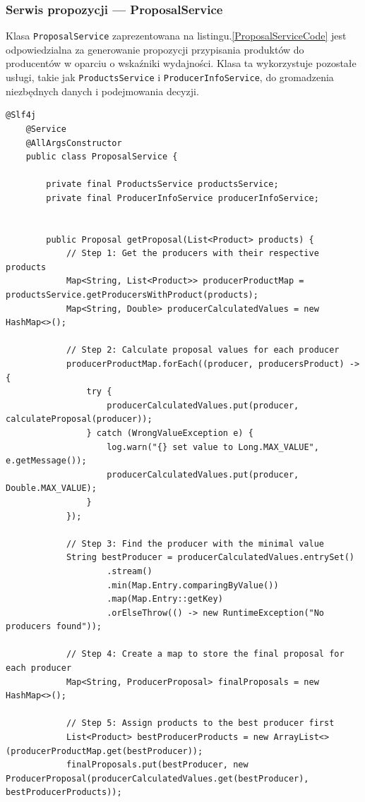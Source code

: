 \subsubsection{Serwis propozycji --- ProposalService}

Klasa \verb|ProposalService| zaprezentowana na listingu.\ref{ProposalServiceCode} jest odpowiedzialna za generowanie propozycji przypisania produktów do producentów w oparciu o wskaźniki wydajności. Klasa ta wykorzystuje pozostałe usługi, takie jak \verb|ProductsService| i \verb|ProducerInfoService|, do gromadzenia niezbędnych danych i podejmowania decyzji.

\begin{lstlisting}[caption=Kod klasy ProposalService, label=ProposalServiceCode] 
    @Slf4j
    @Service
    @AllArgsConstructor
    public class ProposalService {
    
        private final ProductsService productsService;
        private final ProducerInfoService producerInfoService;
    
    
        public Proposal getProposal(List<Product> products) {
            // Step 1: Get the producers with their respective products
            Map<String, List<Product>> producerProductMap = productsService.getProducersWithProduct(products);
            Map<String, Double> producerCalculatedValues = new HashMap<>();
    
            // Step 2: Calculate proposal values for each producer
            producerProductMap.forEach((producer, producersProduct) -> {
                try {
                    producerCalculatedValues.put(producer, calculateProposal(producer));
                } catch (WrongValueException e) {
                    log.warn("{} set value to Long.MAX_VALUE", e.getMessage());
                    producerCalculatedValues.put(producer, Double.MAX_VALUE);
                }
            });
    
            // Step 3: Find the producer with the minimal value
            String bestProducer = producerCalculatedValues.entrySet()
                    .stream()
                    .min(Map.Entry.comparingByValue())
                    .map(Map.Entry::getKey)
                    .orElseThrow(() -> new RuntimeException("No producers found"));
    
            // Step 4: Create a map to store the final proposal for each producer
            Map<String, ProducerProposal> finalProposals = new HashMap<>();
    
            // Step 5: Assign products to the best producer first
            List<Product> bestProducerProducts = new ArrayList<>(producerProductMap.get(bestProducer));
            finalProposals.put(bestProducer, new ProducerProposal(producerCalculatedValues.get(bestProducer), bestProducerProducts));
    

\end{lstlisting}
